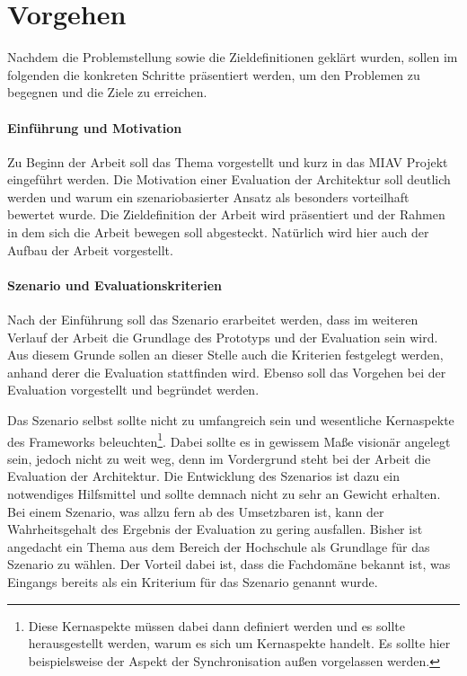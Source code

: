\documentclass[12pt,headsepline,a4paper,bibtotoc,liststotoc,DIV12,BCOR12mm]{scrartcl}
\begin{document}

\section{Vorgehen} %
\label{sec:vorgehen}

  Nachdem die Problemstellung sowie die Zieldefinitionen geklärt wurden, sollen im folgenden die konkreten Schritte präsentiert werden, um den Problemen zu begegnen und die Ziele zu erreichen.

\paragraph{Einführung und Motivation} %
\label{par:einfuehrung}
  
  Zu Beginn der Arbeit soll das Thema vorgestellt und kurz in das MIAV Projekt eingeführt werden. Die Motivation einer Evaluation der Architektur soll deutlich werden und warum ein szenariobasierter Ansatz als besonders vorteilhaft bewertet wurde. Die Zieldefinition der Arbeit wird präsentiert und der Rahmen in dem sich die Arbeit bewegen soll abgesteckt. Natürlich wird hier auch der Aufbau der Arbeit vorgestellt.
  

\paragraph{Szenario und Evaluationskriterien} %
\label{par:szenario_und_evaluationskriterien}

  Nach der Einführung soll das Szenario erarbeitet werden, dass im weiteren Verlauf der Arbeit die Grundlage des Prototyps und der Evaluation sein wird. Aus diesem Grunde sollen an dieser Stelle auch die Kriterien festgelegt werden, anhand derer die Evaluation stattfinden wird. Ebenso soll das Vorgehen bei der Evaluation vorgestellt und begründet werden.
  
  Das Szenario selbst sollte nicht zu umfangreich sein und wesentliche Kernaspekte des Frameworks beleuchten\footnote{Diese Kernaspekte müssen dabei dann definiert werden und es sollte herausgestellt werden, warum es sich um Kernaspekte handelt. Es sollte hier beispielsweise der Aspekt der Synchronisation außen vorgelassen werden.}. Dabei sollte es in gewissem Maße visionär angelegt sein, jedoch nicht zu weit weg, denn im Vordergrund steht bei der Arbeit die Evaluation der Architektur. Die Entwicklung des Szenarios ist dazu ein notwendiges Hilfsmittel und sollte demnach nicht zu sehr an Gewicht erhalten. Bei einem Szenario, was allzu fern ab des Umsetzbaren ist, kann der Wahrheitsgehalt des Ergebnis der Evaluation zu gering ausfallen. Bisher ist angedacht ein Thema aus dem Bereich der Hochschule als Grundlage für das Szenario zu wählen. Der Vorteil dabei ist, dass die Fachdomäne bekannt ist, was Eingangs bereits als ein Kriterium für das Szenario genannt wurde.
  
\end{document}
